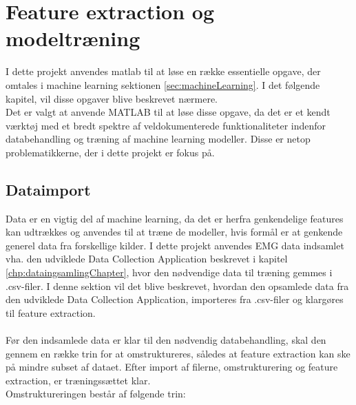 \thispagestyle{fancy}
\chapter{Feature extraction og modeltræning}
\label{chp:matlabChapter}
I dette projekt anvendes matlab til at løse en række essentielle opgave, der omtales i machine learning sektionen \ref{sec:machineLearning}. I det følgende kapitel, vil disse opgaver blive beskrevet nærmere. \\
Det er valgt at anvende MATLAB til at løse disse opgave, da det er et kendt værktøj med et bredt spektre af veldokumenterede funktionaliteter indenfor databehandling\citep{matlabFeatures} og træning af machine learning modeller\citep{matlabML}. Disse er netop problematikkerne, der i dette projekt er fokus på. 

\section{Dataimport}
Data er en vigtig del af machine learning, da det er herfra genkendelige features kan udtrækkes og anvendes til at træne de modeller, hvis formål er at genkende generel data fra forskellige kilder. I dette projekt anvendes EMG data indsamlet vha. den udviklede Data Collection Application beskrevet i kapitel \ref{chp:dataingsamlingChapter}, hvor den nødvendige data til træning gemmes i .csv-filer. I denne sektion vil det blive beskrevet, hvordan den opsamlede data fra den udviklede Data Collection Application, importeres fra .csv-filer og klargøres til feature extraction.
\\\\
Før den indsamlede data er klar til den nødvendig databehandling, skal den gennem en række trin for at omstruktureres, således at feature extraction kan ske på mindre subset af dataet. Efter import af filerne, omstrukturering og feature extraction, er træningssættet klar.  
\\ Omstruktureringen består af følgende trin:
